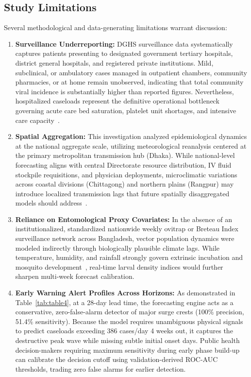 \documentclass[11pt,a4paper]{article}
\begin{document}
\subsection{Study Limitations}
Several methodological and data-generating limitations warrant discussion:
\begin{enumerate}
    \item \textbf{Surveillance Underreporting:} DGHS surveillance data systematically captures patients presenting to designated government tertiary hospitals, district general hospitals, and registered private institutions. Mild, subclinical, or ambulatory cases managed in outpatient chambers, community pharmacies, or at home remain unobserved, indicating that total community viral incidence is substantially higher than reported figures. Nevertheless, hospitalized caseloads represent the definitive operational bottleneck governing acute care bed saturation, platelet unit shortages, and intensive care capacity~\cite{rahman2024changing,hossain2024catastrophic}.
    \item \textbf{Spatial Aggregation:} This investigation analyzed epidemiological dynamics at the national aggregate scale, utilizing meteorological reanalysis centered at the primary metropolitan transmission hub (Dhaka). While national-level forecasting aligns with central Directorate resource distribution, IV fluid stockpile requisitions, and physician deployments, microclimatic variations across coastal divisions (Chittagong) and northern plains (Rangpur) may introduce localized transmission lags that future spatially disaggregated models should address~\cite{johansson2019open,lowe2016evaluating}.
    \item \textbf{Reliance on Entomological Proxy Covariates:} In the absence of an institutionalized, standardized nationwide weekly ovitrap or Breteau Index surveillance network across Bangladesh, vector population dynamics were modeled indirectly through biologically plausible climate lags. While temperature, humidity, and rainfall strongly govern extrinsic incubation and mosquito development~\cite{watts1987effect,mordecai2019thermal,brady2014global,carrington2013effects,colon2013effects}, real-time larval density indices would further sharpen multi-week forecast calibration.
    \item \textbf{Early Warning Alert Profiles Across Horizons:} As demonstrated in Table~\ref{tab:table4}, at a 28-day lead time, the forecasting engine acts as a conservative, zero-false-alarm detector of major surge crests (100\% precision, 51.4\% sensitivity). Because the model requires unambiguous physical signals to predict caseloads exceeding 386 cases/day 4 weeks out, it captures the destructive peak wave while missing subtle initial onset days. Public health decision-makers requiring maximum sensitivity during early phase build-up can calibrate the decision cutoff using validation-derived ROC-AUC thresholds, trading zero false alarms for earlier detection.
\end{enumerate}
\end{document}
